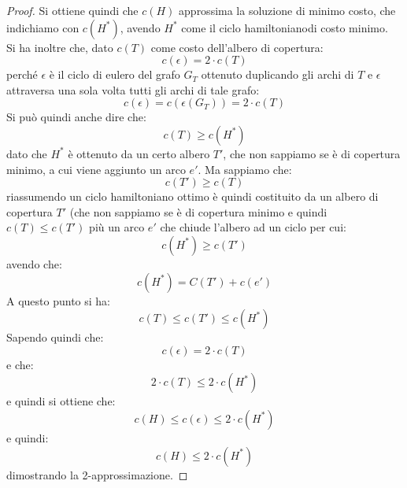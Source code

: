\documentclass[a4paper,12pt, oneside]{book}
\begin{document}
\begin{proof}
  Si ottiene quindi che $c(H)$ approssima la soluzione di minimo costo, che
  indichiamo con $c(H^*)$, avendo $H^*$ come il ciclo hamiltonianodi costo
  minimo. \\
  Si ha inoltre che, dato $c(T)$ come costo dell'albero di copertura:
  \[c(\epsilon)=2\cdot c(T)\]
  perché $\epsilon$ è il ciclo di eulero del grafo $G_T$ ottenuto duplicando gli
  archi di $T$ e $\epsilon$ attraversa una sola volta tutti gli archi di tale
  grafo:
  \[c(\epsilon)=c(\epsilon(G_T))=2\cdot c(T)\]
  Si può quindi anche dire che:
  \[c(T)\geq c(H^*)\]
  dato che $H^*$ è ottenuto da un certo albero $T'$, che non sappiamo se è di
  copertura minimo, a cui viene aggiunto un arco $e'$.
  Ma sappiamo che:
  \[c(T')\geq c(T)\]
  riassumendo un ciclo hamiltoniano ottimo è quindi costituito da un albero di
  copertura $T'$ (che non sappiamo se è di copertura minimo e quindi $c(T)\leq
  c(T')$ più un arco $e'$ che chiude l'albero ad un ciclo per cui: 
  \[c(H^*)\geq c(T')\]
  avendo che:
  \[c(H^*)=C(T')+c(e')\]
  A questo punto si ha:
  \[c(T)\leq c(T')\leq c(H^*)\]
  Sapendo quindi che:
  \[c(\epsilon)=2\cdot c(T)\]
  e che:
  \[2\cdot c(T)\leq 2\cdot c(H^*)\]
  e quindi si ottiene che:
  \[c(H)\leq c(\epsilon)\leq 2\cdot c(H^*)\]
  e quindi:
  \[c(H)\leq 2\cdot c(H^*)\]
  dimostrando la 2-approssimazione.
\end{proof}
\end{document}
